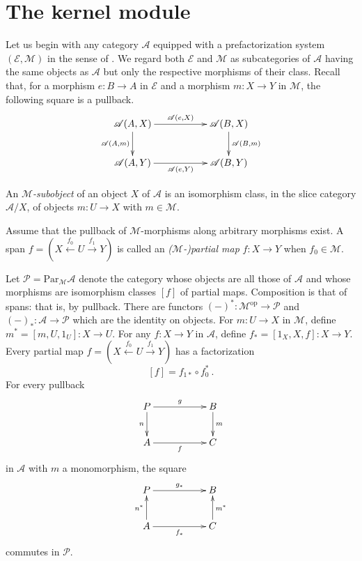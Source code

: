 \documentclass[a4paper,12pt,reqno]{amsart}
\theoremstyle{definition}
\theoremstyle{fact}
\theoremstyle{genquest}
\theoremstyle{step}
\newcommand{\lra}{\longrightarrow}
\newcommand{\lla}{\longleftarrow}
\def\CA{{\mathscr A}}
\def\CE{{\mathscr E}}
\def\CM{{\mathscr M}}
\def\CP{{\mathscr P}}
\begin{document}
\section{The kernel module}\label{km}

Let us begin with any category $\CA$ equipped with a 
prefactorization system $(\CE,\CM)$ in the sense of \cite{FreydKelly}.
We regard both $\CE$ and $\CM$ as subcategories of $\CA$
having the same objects as $\CA$ but only the respective 
morphisms of their class.  
Recall that, for a morphism $e : B \lra A$ in $\CE$ and a morphism $m : X \lra Y$
in $\CM$, the following square is a pullback.
\begin{eqnarray}\label{strepi}
\begin{aligned}
\xymatrix{
\CA(A,X) \ar[rr]^-{\CA(e,X)} \ar[d]_-{\CA(A,m)} && \CA(B,X) \ar[d]^-{\CA(B,m)} \\
\CA(A,Y) \ar[rr]_-{\CA(e,Y)} && \CA(B,Y)}
\end{aligned}
\end{eqnarray}

An {\em $\CM$-subobject} of an object $X$ of $\CA$ is an isomorphism
class, in the slice category $\CA /X$, of objects $m : U \lra X$ with $m\in \CM$.    

Assume that the pullback of $\CM$-morphisms along arbitrary morphisms exist. 
A span $f = (X\stackrel{f_0}\lla U \stackrel{f_1}\lra Y)$ is called an 
{\em ($\CM$-)partial map} $f : X\lra Y$ when $f_0\in \CM$. 

Let $\CP = \mathrm{Par}_{\CM}\CA$ 
denote the category whose objects are all those of $\CA$ and 
whose morphisms are isomorphism classes $[f]$ of partial maps. 
Composition is that of spans: that is, by pullback.
There are functors $(-)^* : \CM^{\mathrm{op}} \lra \CP$
and $(-)_* : \CA \lra \CP$ which are the identity on objects.
For $m:U\lra X$ in $\CM$, define $m^*= [m,U,1_U] : X\lra U$.
For any $f: X \lra Y$ in $\CA$, define $f_*=[1_X,X,f] : X \lra Y$.
Every partial map $f = (X\stackrel{f_0}\lla U \stackrel{f_1}\lra Y)$ has
a factorization $$[f] = f_{1*}\circ f_0^* \ .$$ 
For every pullback
\begin{equation}\label{pbm}
\xymatrix{
P \ar[rr]^-{g} \ar[d]_-{n} && B \ar[d]^-{m} \\
A \ar[rr]_-{f} && C}
\end{equation}
in $\CA$ with $m$ a monomorphism, the square
\begin{equation}
\xymatrix{
P \ar[rr]^-{g_*}  && B  \\
A \ar[rr]_-{f_*} \ar[u]^-{n^*} && C \ar[u]_-{m^*}}
\end{equation}
commutes in $\CP$. 
\end{document}
